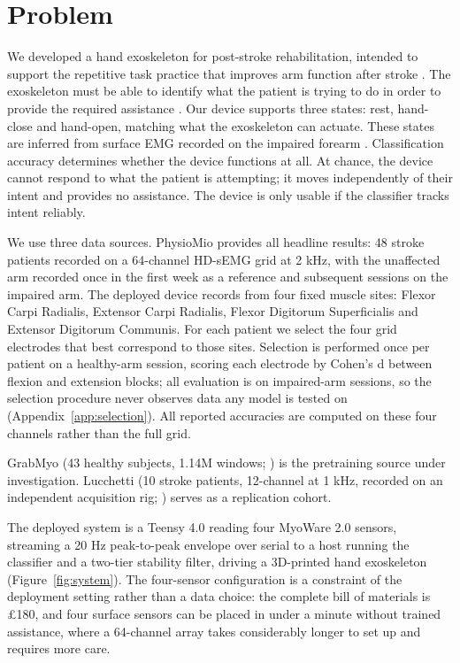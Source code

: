 \documentclass{article}
\begin{document}
\section{Problem}

We developed a hand exoskeleton for post-stroke rehabilitation, intended to support the repetitive task practice that improves arm function after stroke \citep{french2016, mehrholz2018}. The exoskeleton must be able to identify what the patient is trying to do in order to provide the required assistance \citep{lu2017}. Our device supports three states: rest, hand-close and hand-open, matching what the exoskeleton can actuate. These states are inferred from surface EMG recorded on the impaired forearm \citep{lee2011}. Classification accuracy determines whether the device functions at all. At chance, the device cannot respond to what the patient is attempting; it moves independently of their intent and provides no assistance. The device is only usable if the classifier tracks intent reliably.

We use three data sources. PhysioMio \citep{physiomio2026} provides all headline results: 48 stroke patients recorded on a 64-channel HD-sEMG grid at 2 kHz, with the unaffected arm recorded once in the first week as a reference and subsequent sessions on the impaired arm. The deployed device records from four fixed muscle sites: Flexor Carpi Radialis, Extensor Carpi Radialis, Flexor Digitorum Superficialis and Extensor Digitorum Communis. For each patient we select the four grid electrodes that best correspond to those sites. Selection is performed once per patient on a healthy-arm session, scoring each electrode by Cohen's d between flexion and extension blocks; all evaluation is on impaired-arm sessions, so the selection procedure never observes data any model is tested on (Appendix~\ref{app:selection}). All reported accuracies are computed on these four channels rather than the full grid.

GrabMyo (43 healthy subjects, 1.14M windows; \citealp{pradhan2022, grabmyo2022physionet}) is the pretraining source under investigation. Lucchetti (10 stroke patients, 12-channel at 1 kHz, recorded on an independent acquisition rig; \citealp{lucchetti2025}) serves as a replication cohort.

The deployed system is a Teensy 4.0 reading four MyoWare 2.0 sensors, streaming a 20 Hz peak-to-peak envelope over serial to a host running the classifier and a two-tier stability filter, driving a 3D-printed hand exoskeleton (Figure~\ref{fig:system}). The four-sensor configuration is a constraint of the deployment setting rather than a data choice: the complete bill of materials is \pounds 180, and four surface sensors can be placed in under a minute without trained assistance, where a 64-channel array takes considerably longer to set up and requires more care.
\end{document}
